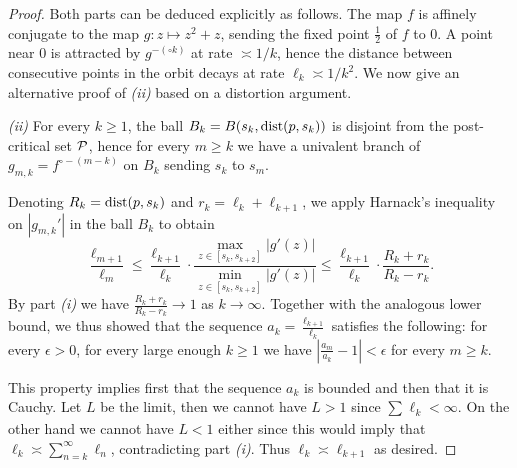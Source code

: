 \begin{proof} \leavevmode
		Both parts can be deduced explicitly as follows. The map $f$ is affinely conjugate to the map $g: z\mapsto z^2+z$, sending the fixed point $\frac 12$ of $f$ to $0$. A point near $0$ is attracted by $g^{-(\circ k)}$ at rate $\asymp 1/k$, hence the distance between consecutive points in the orbit decays at rate $\ell_k \asymp 1/{k^2}$. We now give an alternative proof of \emph{(ii)} based on a distortion argument.
		
		\emph{(ii)} For every $k \geq 1$, the ball $B_k = B(s_k, \operatorname{dist}(p,s_k))$
		is disjoint from the post-critical set $\operatorname{\mathcal P}$, hence for every $m \geq k$ we have 
		a univalent branch of $g_{m,k}=f^{\circ -(m-k)}$ on $B_k$ sending $s_k$ to $s_m$.
		
		Denoting $R_k= \operatorname{dist}(p,s_k)$ and $r_k = \ell_k+\ell_{k+1}$, we apply Harnack's inequality on $|g_{m,k}'|$ in the ball $B_k$ to obtain 
		\begin{equation*}
			\frac{\ell_{m+1}}{\ell_m} \leq \frac{\ell_{k+1}}{\ell_k} \cdot \frac{\max_{z\in [s_k,s_{k+2}]} |g'(z)|}{\min_{z \in [s_k,s_{k+2}]} |g'(z)|} \leq \frac{\ell_{k+1}}{\ell_k} \cdot \frac{R_k+r_k}{R_k-r_k}.
		\end{equation*}
		By part \emph{(i)} we have $\frac{R_k+r_k}{R_k-r_k} \to 1$ as $k \to \infty$. Together with the analogous lower bound, we thus showed that the sequence $a_k = \frac{\ell_{k+1}}{\ell_k}$ satisfies the following: for every $\epsilon >0$, for every large enough $k \geq 1$ we have $\left | \frac {a_m}{a_k}-1 \right | < \epsilon$ for every $m \geq k$.
		
		This property implies first that the sequence $a_k$ is bounded and then that it is Cauchy. Let $L$ be the limit, then we cannot have $L>1$ since $\sum_{}\ell_k < \infty$. On the other hand we cannot have $L<1$ either since this would imply that $\ell_k \asymp \sum_{n=k}^\infty \ell_n$, contradicting part \emph{(i)}. Thus $\ell_k \asymp \ell _{k+1}$ as desired.
\end{proof}

%

